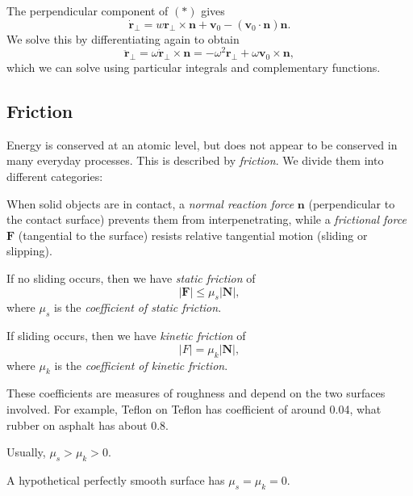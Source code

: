 \documentclass[a4paper]{article}
\begin{document}
The perpendicular component of $(*)$ gives
\[
  \dot{\mathbf{r}}_\bot = w\mathbf{r}_\bot \times \mathbf{n} + \mathbf{v}_0 - (\mathbf{v}_0\cdot \mathbf{n})\mathbf{n}.
\]
We solve this by differentiating again to obtain
\[
  \ddot{\mathbf{r}}_\bot = \omega \dot{\mathbf{r}}_\bot \times \mathbf{n} = -\omega^2 \mathbf{r}_\bot + \omega \mathbf{v}_0 \times \mathbf{n},
\]
which we can solve using particular integrals and complementary functions.

\subsection{Friction}
Energy is conserved at an atomic level, but does not appear to be conserved in many everyday processes. This is described by \emph{friction}. We divide them into different categories:
\begin{defi}
  When solid objects are in contact, a \emph{normal reaction force} $\mathbf{n}$ (perpendicular to the contact surface) prevents them from interpenetrating, while a \emph{frictional force} $\mathbf{F}$ (tangential to the surface) resists relative tangential motion (sliding or slipping).
  \begin{center}
  \end{center}
  If no sliding occurs, then we have \emph{static friction} of
  \[
    |\mathbf{F}| \leq \mu_s |\mathbf{N}|,
  \]
  where $\mu_s$ is the \emph{coefficient of static friction}.

  If sliding occurs, then we have \emph{kinetic friction} of 
  \[
    |F| = \mu_k |\mathbf{N}|,
  \]
  where $\mu_k$ is the \emph{coefficient of kinetic friction}.

  These coefficients are measures of roughness and depend on the two surfaces involved. For example, Teflon on Teflon has coefficient of around 0.04, what rubber on asphalt has about 0.8.

  Usually, $\mu_s > \mu_k > 0$.

  A hypothetical perfectly smooth surface has $\mu_s = \mu_k =0$.
\end{defi}
\end{document}
